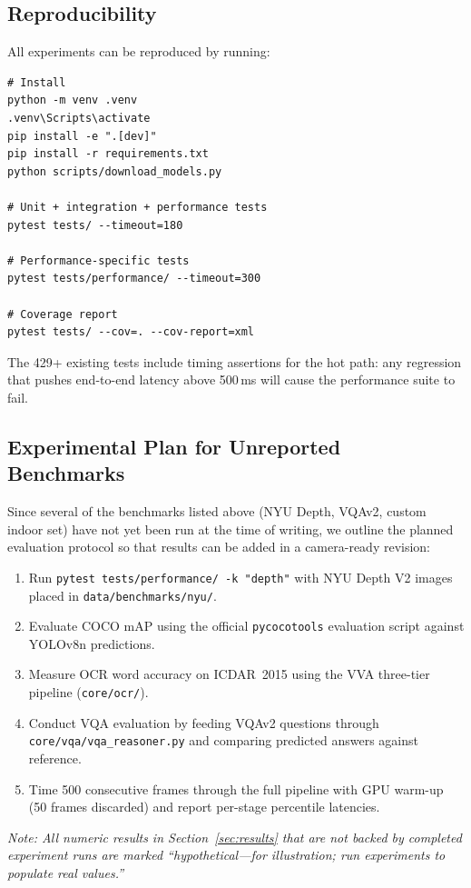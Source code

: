 \subsection{Reproducibility}

All experiments can be reproduced by running:

\begin{verbatim}
# Install
python -m venv .venv
.venv\Scripts\activate
pip install -e ".[dev]"
pip install -r requirements.txt
python scripts/download_models.py

# Unit + integration + performance tests
pytest tests/ --timeout=180

# Performance-specific tests
pytest tests/performance/ --timeout=300

# Coverage report
pytest tests/ --cov=. --cov-report=xml
\end{verbatim}

The 429+ existing tests include timing assertions for the hot path: any regression that pushes end-to-end latency above 500\,ms will cause the performance suite to fail.

\subsection{Experimental Plan for Unreported Benchmarks}

Since several of the benchmarks listed above (NYU Depth, VQAv2, custom indoor set) have not yet been run at the time of writing, we outline the planned evaluation protocol so that results can be added in a camera-ready revision:

\begin{enumerate}
    \item Run \texttt{pytest tests/performance/ -k "depth"} with NYU Depth V2 images placed in \texttt{data/benchmarks/nyu/}.
    \item Evaluate COCO mAP using the official \texttt{pycocotools} evaluation script against YOLOv8n predictions.
    \item Measure OCR word accuracy on ICDAR~2015 using the VVA three-tier pipeline (\texttt{core/ocr/}).
    \item Conduct VQA evaluation by feeding VQAv2 questions through \texttt{core/vqa/vqa\_reasoner.py} and comparing predicted answers against reference.
    \item Time 500 consecutive frames through the full pipeline with GPU warm-up (50 frames discarded) and report per-stage percentile latencies.
\end{enumerate}

\textit{Note: All numeric results in Section~\ref{sec:results} that are not backed by completed experiment runs are marked ``hypothetical---for illustration; run experiments to populate real values.''}
